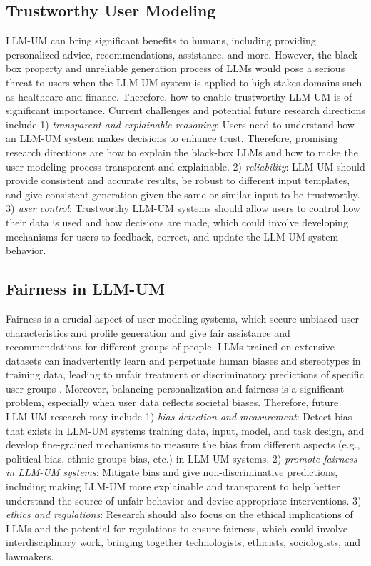 \documentclass[11pt]{article}
\begin{document}
\subsection{Trustworthy User Modeling}
LLM-UM can bring significant benefits to humans, including providing personalized advice, recommendations, assistance, and more. However, the black-box property and unreliable generation process of LLMs would pose a serious threat to users when the LLM-UM system is applied to high-stakes domains such as healthcare and finance. Therefore, how to enable trustworthy LLM-UM is of significant importance. Current challenges and potential future research directions include 1) \textit{transparent and explainable reasoning}: Users need to understand how an LLM-UM system makes decisions to enhance trust. Therefore, promising research directions are how to explain the black-box LLMs and how to make the user modeling process transparent and explainable.
2) \textit{reliability}: LLM-UM should provide consistent and accurate results, be robust to different input templates, and give consistent generation given the same or similar input to be trustworthy. 
3) \textit{user control}: Trustworthy LLM-UM systems should allow users to control how their data is used and how decisions are made, which could involve developing mechanisms for users to feedback, correct, and update the LLM-UM system behavior.


\subsection{Fairness in LLM-UM}
Fairness is a crucial aspect of user modeling systems, which secure unbiased user characteristics and profile generation and give fair assistance and recommendations for different groups of people. LLMs trained on extensive datasets can inadvertently learn and perpetuate human biases and stereotypes in training data, leading to unfair treatment or discriminatory predictions of specific user groups \cite{feng2023pretraining}. Moreover, balancing personalization and fairness is a significant problem, especially when user data reflects societal biases. Therefore, future LLM-UM research may include 1) \textit{bias detection and measurement}: Detect bias that exists in LLM-UM systems training data, input, model, and task design, and develop fine-grained mechanisms to measure the bias from different aspects (e.g., political bias, ethnic groups bias, etc.) in LLM-UM systems. 2) \textit{promote fairness in LLM-UM systems}: Mitigate bias and give non-discriminative predictions, including making LLM-UM more explainable and transparent to help better understand the source of unfair behavior and devise appropriate interventions. 3) \textit{ethics and regulations}: Research should also focus on the ethical implications of LLMs and the potential for regulations to ensure fairness, which could involve interdisciplinary work, bringing together technologists, ethicists, sociologists, and lawmakers.
\end{document}
